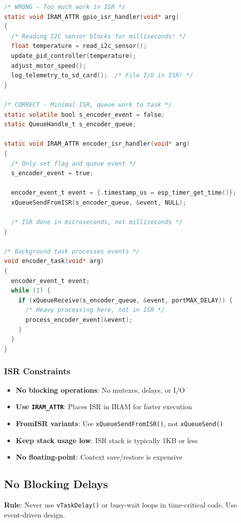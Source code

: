 \begin{lstlisting}[language=C]
/* WRONG - Too much work in ISR */
static void IRAM_ATTR gpio_isr_handler(void* arg)
{
  /* Reading I2C sensor blocks for milliseconds! */
  float temperature = read_i2c_sensor();
  update_pid_controller(temperature);
  adjust_motor_speed();
  log_telemetry_to_sd_card();  /* File I/O in ISR! */
}

/* CORRECT - Minimal ISR, queue work to task */
static volatile bool s_encoder_event = false;
static QueueHandle_t s_encoder_queue;

static void IRAM_ATTR encoder_isr_handler(void* arg)
{
  /* Only set flag and queue event */
  s_encoder_event = true;
  
  encoder_event_t event = {.timestamp_us = esp_timer_get_time()};
  xQueueSendFromISR(s_encoder_queue, &event, NULL);
  
  /* ISR done in microseconds, not milliseconds */
}

/* Background task processes events */
void encoder_task(void* arg)
{
  encoder_event_t event;
  while (1) {
    if (xQueueReceive(s_encoder_queue, &event, portMAX_DELAY)) {
      /* Heavy processing here, not in ISR */
      process_encoder_event(&event);
    }
  }
}


\end{lstlisting}
\subsubsection{ISR Constraints}

\begin{itemize}
\item \textbf{No blocking operations}: No mutexes, delays, or I/O
\item \textbf{Use \texttt{IRAM\_ATTR}}: Places ISR in IRAM for faster execution
\item \textbf{FromISR variants}: Use \texttt{xQueueSendFromISR()}, not \texttt{xQueueSend()}
\item \textbf{Keep stack usage low}: ISR stack is typically 1KB or less
\item \textbf{No floating-point}: Context save/restore is expensive
\end{itemize}

\subsection{No Blocking Delays}

\textbf{Rule}: Never use \texttt{vTaskDelay()} or busy-wait loops in time-critical code. Use event-driven design.

